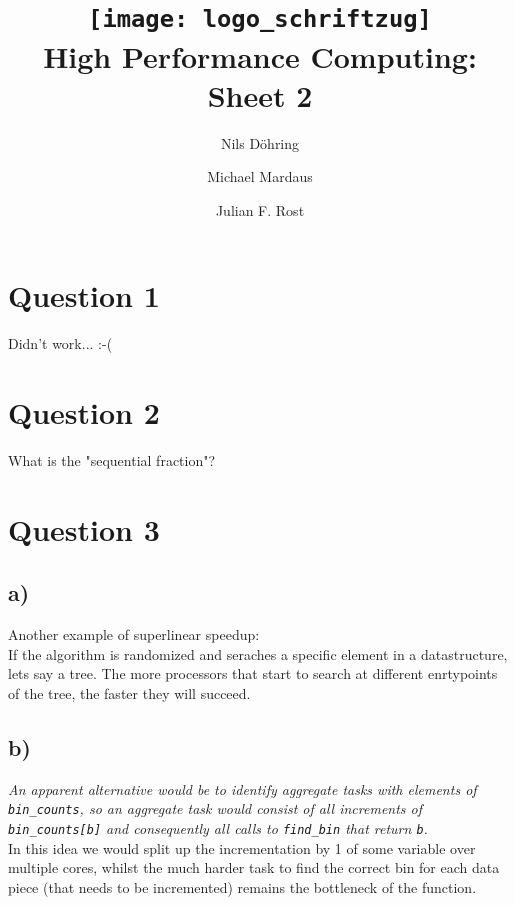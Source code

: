 \documentclass[10pt,a4paper]{scrartcl}
\author{Nils Döhring \and Michael Mardaus \and Julian F. Rost}
\title{\texttt{[image: logo\_schriftzug]}\\ High Performance Computing:
Sheet 2}
\begin{document}
\maketitle


\section{Question 1}
Didn't work... :-(

\section{Question 2}
What is the "sequential fraction"?

\section{Question 3}

\subsection{a)}
Another example of superlinear speedup:\\
If the algorithm is randomized and seraches a specific element in a datastructure, lets say a tree. The more processors that start to search at different enrtypoints of the tree, the faster they will succeed.

\subsection{b)}
\textit{An apparent alternative would be to identify aggregate tasks with elements of \texttt{bin\_counts}, so an aggregate task would consist of all
increments of \texttt{bin\_counts[b]} and consequently all calls to \texttt{find\_bin} that return \texttt{b}.}\\

In this idea we would split up the incrementation by 1 of some variable over multiple cores, whilst the much harder task to find the correct bin for each data piece (that needs to be incremented) remains the bottleneck of the function. 
\end{document}
